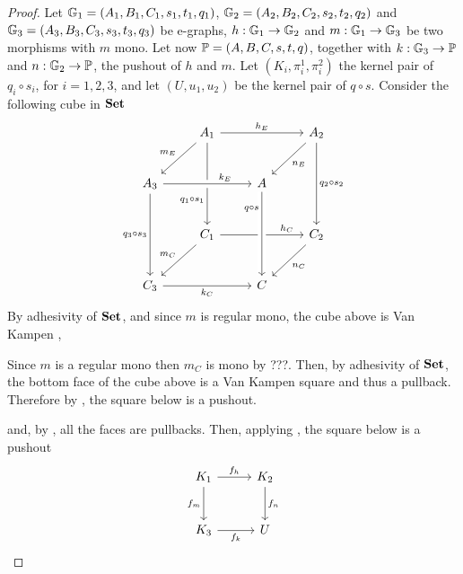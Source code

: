 \begin{proof}
	Let $\mathbb{G}_1 = (A_1, B_1, C_1, s_1, t_1, q_1)$, $\mathbb{G}_2 = (A_2, B_2, C_2, s_2, t_2, q_2)$ and $\mathbb{G}_3 = (A_3, B_3, C_3, s_3, t_3, q_3)$ be e-graphs,  $h: \mathbb{G}_1 \to \mathbb{G}_2$ and $m: \mathbb{G}_1 \to \mathbb{G}_3$ be two morphisms with $m$ mono. Let now $\mathbb{P} = (A, B, C, s, t, q)$, together with $k: \mathbb{G}_3 \to \mathbb{P}$ and $n: \mathbb{G}_2 \to \mathbb{P}$, the pushout of $h$ and $m$.
	Let $(K_i, \pi_i^1, \pi_i^2)$ the kernel pair of $q_i\circ s_i$, for $i = 1, 2, 3$, and let $(U, u_1, u_2)$ be the kernel pair of $q \circ s$.
	Consider the following cube in $\mathbf{Set}$
	\[\begin{tikzcd}[row sep=25, column sep = 25]
	& {A_1} && {A_2} \\
	{A_3} && A \\
	& {C_1} && {C_2} \\
	{C_3} && C
	\arrow["{h_E}", from=1-2, to=1-4]
	\arrow["{m_E}"', from=1-2, to=2-1]
	\arrow["{q_1\circ s_1}"'{pos=0.7}, from=1-2, to=3-2]
	\arrow["{n_E}", from=1-4, to=2-3]
	\arrow["{q_2\circ s_2}", from=1-4, to=3-4]
	\arrow["{k_E}"{pos=0.7}, from=2-1, to=2-3, crossing over]
	\arrow["{q_3\circ s_3}"', from=2-1, to=4-1]
	\arrow["{h_C}"{pos=0.8}, from=3-2, to=3-4]
	\arrow["{m_C}"', from=3-2, to=4-1]
	\arrow["{n_C}", from=3-4, to=4-3]
	\arrow["{k_C}"', from=4-1, to=4-3]
	\arrow["{q\circ s}"'{pos=0.2}, from=2-3, to=4-3, crossing over]
	\end{tikzcd}\]
	By adhesivity of $\mathbf{Set}$, and since $m$ is regular mono, the cube above is Van Kampen ,
	
	\color{blue}
	
	Since $m$ is a regular mono then $m_C$ is mono by ???. Then, by adhesivity of $\mathbf{Set}$, the bottom face of the cube above is a Van Kampen square and thus a pullback. Therefore by , the square below is a pushout.
	\color{black}
	
	 and, by , all the  faces are pullbacks. Then, applying , the square below is a pushout
	\[\begin{tikzcd}[row sep=27, column sep = 27]
		K_1 \ar[r, "{f_h}"] \ar[d, "{f_m}"swap] & K_2 \ar[d, "{f_n}"] \\
		K_3 \ar[r, "{f_k}"swap] & U
	\end{tikzcd}\]


\end{proof}
